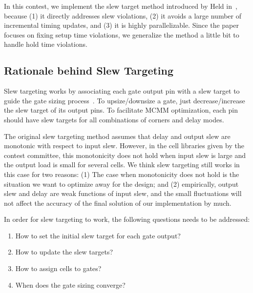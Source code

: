 In this contest, we implement the slew target method introduced by Held in~\cite{Held:Gate}, because (1) it directly addresses slew violations, (2) it avoids a large number of incremental timing updates, and (3) it is highly parallelizable. Since the paper focuses on fixing setup time violations, we generalize the method a little bit to handle hold time violations.


\subsection{Rationale behind Slew Targeting}

Slew targeting works by associating each gate output pin with a slew target to guide the gate sizing process~\cite{Held:Gate}. To upsize/downsize a gate, just decrease/increase the slew target of its output pins. To facilitate MCMM optimization, each pin should have slew targets for all combinations of corners and delay modes.

The original slew targeting method assumes that delay and output slew are monotonic with respect to input slew. However, in the cell libraries given by the contest committee, this monotonicity does not hold when input slew is large and the output load is small for several cells. We think slew targeting still works in this case for two reasons: (1) The case when monotonicity does not hold is the situation we want to optimize away for the design; and (2) empirically, output slew and delay are weak functions of input slew, and the small fluctuations will not affect the accuracy of the final solution of our implementation by much.

In order for slew targeting to work, the following questions needs to be addressed:
\begin{enumerate}
\item How to set the initial slew target for each gate output?
\item How to update the slew targets?
\item How to assign cells to gates?
\item When does the gate sizing converge?
\end{enumerate}

